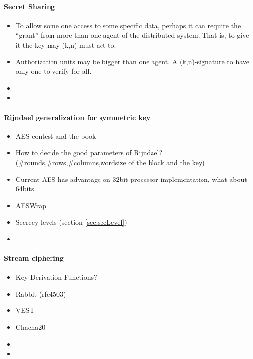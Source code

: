 \documentclass[10pt,a4paper,twoside]{llncs}
\begin{document}
\paragraph*{Secret Sharing \label{sec:secretSharing}}

\begin{itemize}
    \item To allow some one access to some specific data, perhaps it can require the ``grant'' from more than one agent of the distributed system. That is, to give it the key may (k,n) must act to.
    \item Authorization units may be bigger than one agent. A (k,n)-signature to have only one to verify for all.
    \item
    \item
\end{itemize}


\paragraph{Rijndael generalization for symmetric key \label{sec:symmentrics}}

\begin{itemize}
    \item AES contest \cite{AES-FIPS} and the book \cite{Daemen:2002:DR:560131}
    \item How to decide the good parameters of Rijndael? (\#rounds,\#rows,\#columns,wordsize of the block and the key) \cite{gRijndael}
    \item Current AES has advantage on 32bit processor implementation, what about 64bits
    \item AESWrap \cite{rfc3394}
    \item Secrecy levels (section \ref{sec:secLevel})
    \item 
\end{itemize}


\paragraph{Stream ciphering \label{sec:streamming}}

\begin{itemize}
    \item Key Derivation Functions?
    \item Rabbit (rfc4503)
    \item VEST
    \item Chacha20
    \item
    \item
\end{itemize}
\end{document}
